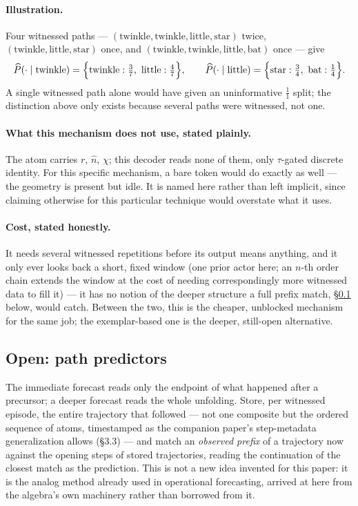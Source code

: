 \documentclass[12pt, a4paper]{article}
\begin{document}
\paragraph{Illustration.} Four witnessed paths ---
$(\text{twinkle},\text{twinkle},\text{little},\text{star})$ twice,
$(\text{twinkle},\text{little},\text{star})$ once, and
$(\text{twinkle},\text{twinkle},\text{little},\text{bat})$ once --- give
\[
\widehat P(\cdot\mid\text{twinkle}) =
\Bigl\{\text{twinkle}:\tfrac{3}{7},\ \text{little}:\tfrac{4}{7}\Bigr\},
\qquad
\widehat P(\cdot\mid\text{little}) =
\Bigl\{\text{star}:\tfrac{3}{4},\ \text{bat}:\tfrac{1}{4}\Bigr\}.
\]
A single witnessed path alone would have given an uninformative
$\tfrac{1}{1}$ split; the distinction above only exists because
several paths were witnessed, not one.

\paragraph{What this mechanism does not use, stated plainly.} The
atom carries $r$, $\hat n$, $\chi$; this decoder reads none of them,
only $\tau$-gated discrete identity. For this specific mechanism, a
bare token would do exactly as well --- the geometry is present but
idle. It is named here rather than left implicit, since claiming
otherwise for this particular technique would overstate what it
uses.

\paragraph{Cost, stated honestly.} It needs several witnessed
repetitions before its output means anything, and it only ever looks
back a short, fixed window (one prior actor here; an $n$-th order
chain extends the window at the cost of needing correspondingly more
witnessed data to fill it) --- it has no notion of the deeper
structure a full prefix match, \S\ref{subsec:path_predictors} below,
would catch. Between the two, this is the cheaper, unblocked
mechanism for the same job; the exemplar-based one is the deeper,
still-open alternative.

\subsection{Open: path predictors}
\label{subsec:path_predictors}

The immediate forecast reads only the endpoint of what happened after
a precursor; a deeper forecast reads the whole unfolding. Store, per
witnessed episode, the entire trajectory that followed --- not one
composite but the ordered sequence of atoms, timestamped as the
companion paper's step-metadata generalization allows (\S3.3) --- and
match an
\emph{observed prefix} of a trajectory now against the opening steps of
stored trajectories, reading the continuation of the closest match as
the prediction. This is not a new idea invented for this paper: it is
the analog method already used in operational forecasting, arrived at
here from the algebra's own machinery rather than borrowed from it.
\end{document}
